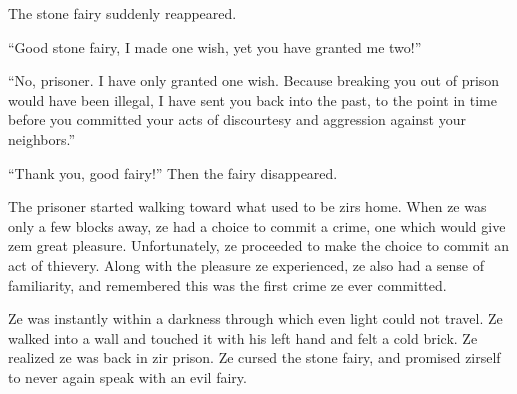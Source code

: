 The stone fairy suddenly reappeared.

“Good stone fairy, I made one wish, yet you have granted me two!”

“No, prisoner. I have only granted one wish. Because breaking you out of prison would have been illegal, I have sent you back into the past, to the point in time before you committed your acts of discourtesy and aggression against your neighbors.”

“Thank you, good fairy!” Then the fairy disappeared.

The prisoner started walking toward what used to be zirs home. When ze was only a few blocks away, ze had a choice to commit a crime, one which would give zem great pleasure. Unfortunately, ze proceeded to make the choice to commit an act of thievery. Along with the pleasure ze experienced, ze also had a sense of familiarity, and remembered this was the first crime ze ever committed.

Ze was instantly within a darkness through which even light could not travel. Ze walked into a wall and touched it with his left hand and felt a cold brick. Ze realized ze was back in zir prison. Ze cursed the stone fairy, and promised zirself to never again speak with an evil fairy.
